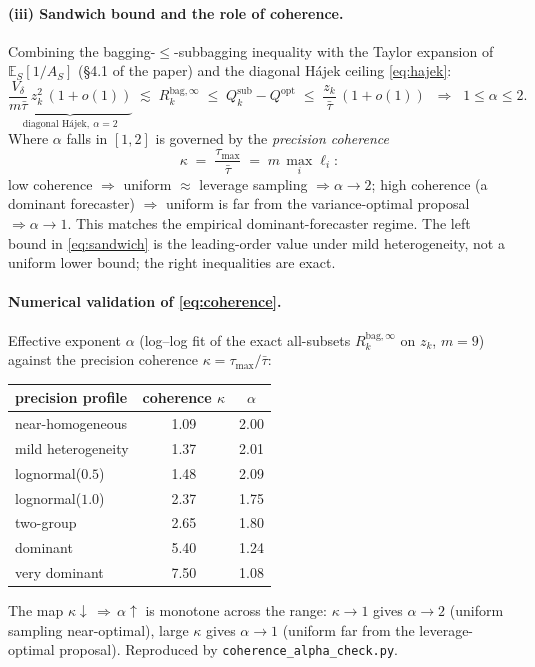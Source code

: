 \documentclass[11pt]{article}
\newcommand{\E}{\mathbb{E}}
\newcommand{\Qopt}{Q^{\mathrm{opt}}}
\newcommand{\Rk}{R_k^{\mathrm{bag},\infty}}
\begin{document}
\paragraph{(iii) Sandwich bound and the role of coherence.}
Combining the bagging-$\le$-subbagging inequality with the Taylor expansion of
$\E_S[1/A_S]$ (\S4.1 of the paper) and the diagonal H\'ajek ceiling \eqref{eq:hajek}:
\begin{equation}\label{eq:sandwich}
  \underbrace{\frac{V_\delta}{m\bar\tau}\,z_k^2\,(1+o(1))}_{\text{diagonal H\'ajek},\ \alpha=2}
  \;\lesssim\;\Rk\;\le\;Q_k^{\mathrm{sub}}-\Qopt\;\le\;\frac{z_k}{\bar\tau}\,(1+o(1))
  \;\;\Longrightarrow\;\; 1\le\alpha\le 2 .
\end{equation}
Where $\alpha$ falls in $[1,2]$ is governed by the \emph{precision coherence}
\begin{equation}\label{eq:coherence}
  \kappa\;=\;\frac{\tau_{\max}}{\bar\tau}\;=\;m\,\max_i \ell_i :
\end{equation}
low coherence $\Rightarrow$ uniform $\approx$ leverage sampling $\Rightarrow \alpha\to2$;
high coherence (a dominant forecaster) $\Rightarrow$ uniform is far from the
variance-optimal proposal $\Rightarrow \alpha\to1$. This matches the empirical
dominant-forecaster regime. The left bound in \eqref{eq:sandwich} is the leading-order
value under mild heterogeneity, not a uniform lower bound; the right inequalities are exact.

\paragraph{Numerical validation of \eqref{eq:coherence}.}
Effective exponent $\alpha$ (log--log fit of the exact all-subsets $\Rk$ on $z_k$,
$m=9$) against the precision coherence $\kappa=\tau_{\max}/\bar\tau$:
\begin{center}
\begin{tabular}{lcc}
\hline
precision profile & coherence $\kappa$ & $\alpha$ \\
\hline
near-homogeneous          & 1.09 & 2.00 \\
mild heterogeneity        & 1.37 & 2.01 \\
lognormal($0.5$)          & 1.48 & 2.09 \\
lognormal($1.0$)          & 2.37 & 1.75 \\
two-group                 & 2.65 & 1.80 \\
dominant                  & 5.40 & 1.24 \\
very dominant             & 7.50 & 1.08 \\
\hline
\end{tabular}
\end{center}
The map $\kappa\downarrow\,\Rightarrow\,\alpha\uparrow$ is monotone across the range:
$\kappa\to1$ gives $\alpha\to2$ (uniform sampling near-optimal), large $\kappa$ gives
$\alpha\to1$ (uniform far from the leverage-optimal proposal). Reproduced by
\texttt{coherence\_alpha\_check.py}.
\end{document}
